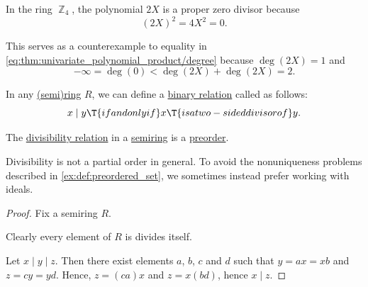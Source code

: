 \begin{example}
\begin{thmenum}
     In the ring \hyperref[def:ring_of_integers_modulo]{\( \BbbZ_4 \)}, the polynomial \( 2X \) is a proper zero divisor because
    \begin{equation*}
      (2X)^2 = 4X^2 = 0.
    \end{equation*}

    This serves as a counterexample to equality in \eqref{eq:thm:univariate_polynomial_product/degree} because \( \deg(2X) = 1 \) and
    \begin{equation*}
      -\infty = \deg(0) < \deg(2X) + \deg(2X) = 2.
    \end{equation*}
  \end{thmenum}
\end{example}

\begin{definition}\label{def:divisibility_relation}
  In any \hyperref[def:semiring]{(semi)ring} \( R \), we can define a \hyperref[def:binary_relation]{binary relation} called  as follows:
  \begin{equation*}
    x \mid y \T{if and only if} x \T{is a two-sided divisor of} y.
  \end{equation*}
\end{definition}

\begin{proposition}\label{thm:semiring_divisibility_order}
  The \hyperref[def:semiring_divisibility]{divisibility relation} in a \hyperref[def:semiring]{semiring} is a \hyperref[def:preordered_set]{preorder}.
\end{proposition}
\begin{comments}
  \item Divisibility is not a partial order in general. To avoid the nonuniqueness problems described in \cref{ex:def:preordered_set}, we sometimes instead prefer working with ideals.
\end{comments}
\begin{proof}
  Fix a semiring \( R \).

   Clearly every element of \( R \) is divides itself.

   Let \( x \mid y \mid z \). Then there exist elements \( a \), \( b \), \( c \) and \( d \) such that \( y = a x = x b \) and \( z = c y = y d \). Hence, \( z = (ca) x \) and \( z = x (bd) \), hence \( x \mid z \).
\end{proof}

